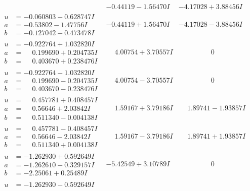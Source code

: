 \documentclass[1p]{elsarticle_modified}
\theoremstyle{definition}
\begin{document}
$$\begin{array}{c|c|c}
 & -0.44119 - 1.56470 I & -4.17028 + 3.88456 I \\ \hline\begin{aligned}
u &= -0.060803 - 0.628747 I \\
a &= -0.53802 - 1.47756 I \\
b &= -0.127042 - 0.473478 I\end{aligned}
 & -0.44119 + 1.56470 I & -4.17028 - 3.88456 I \\ \hline\begin{aligned}
u &= -0.922764 + 1.032820 I \\
a &= \phantom{-}0.199690 + 0.204735 I \\
b &= \phantom{-}0.403670 + 0.238476 I\end{aligned}
 & \phantom{-}4.00754 + 3.70557 I & \phantom{-0.000000 } 0 \\ \hline\begin{aligned}
u &= -0.922764 - 1.032820 I \\
a &= \phantom{-}0.199690 - 0.204735 I \\
b &= \phantom{-}0.403670 - 0.238476 I\end{aligned}
 & \phantom{-}4.00754 - 3.70557 I & \phantom{-0.000000 } 0 \\ \hline\begin{aligned}
u &= \phantom{-}0.457781 + 0.408457 I \\
a &= \phantom{-}0.56646 + 2.03842 I \\
b &= \phantom{-}0.511340 - 0.004138 I\end{aligned}
 & \phantom{-}1.59167 + 3.79186 I & \phantom{-}1.89741 - 1.93857 I \\ \hline\begin{aligned}
u &= \phantom{-}0.457781 - 0.408457 I \\
a &= \phantom{-}0.56646 - 2.03842 I \\
b &= \phantom{-}0.511340 + 0.004138 I\end{aligned}
 & \phantom{-}1.59167 - 3.79186 I & \phantom{-}1.89741 + 1.93857 I \\ \hline\begin{aligned}
u &= -1.262930 + 0.592649 I \\
a &= -1.262610 - 0.329157 I \\
b &= -2.25061 + 0.25489 I\end{aligned}
 & -5.42549 + 3.10789 I & \phantom{-0.000000 } 0 \\ \hline\begin{aligned}
u &= -1.262930 - 0.592649 I \\

\end{aligned}
\end{array}$$
\end{document}
